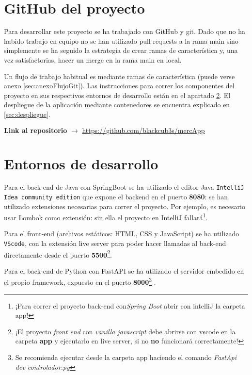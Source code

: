 \documentclass[a4paper,12pt]{report}
\begin{document}
	
	
				
			\section{GitHub del proyecto}
			
				Para desarrollar este proyecto se ha trabajado con GitHub y git. Dado que no ha habido trabajo en equipo no se han utilizado pull requests a la rama main sino simplemente se ha seguido la estrategia de crear ramas de característica y, una vez satisfactorias, hacer un merge en la rama main en local.
				
				Un flujo de trabajo habitual es mediante ramas de característica (puede verse anexo \ref{sec:anexoFlujoGit}). Las instrucciones para correr los componentes del proyecto en sus respectivos entornos de desarrollo están en el apartado \ref{sec:entornosDesarrollo}. El despliegue de la aplicación mediante contenedores se encuentra explicado en \ref{sec:despliegue}.
			

			
			
			
			
				\textbf{Link al repositorio} $\rightarrow$ \href{https://github.com/blackcub3s/mercApp}{https://github.com/blackcub3s/mercApp} 
			
	
	
		
			\section{Entornos de desarrollo}
			\label{sec:entornosDesarrollo}
			
				Para el back-end de Java con SpringBoot se ha utilizado el editor Java \texttt{IntelliJ Idea community edition} que expone el backend en el puerto\textbf{ 8080}: se han utilizado extensiones necesarias para correr el proyecto. Por ejemplo, es necesario usar Lombok como extensión: sin ella el proyecto en IntelliJ fallará\footnote{¡Para correr el proyecto back-end con\textit{Spring Boot} abrir con intelliJ la carpeta app!}.
				
				Para el front-end (archivos estáticos: HTML, CSS y JavaScript) se ha utilizado \texttt{VScode}, con la extensión live server para poder hacer llamadas al back-end directamente desde el puerto \textbf{5500}\footnote{¡El proyecto \textit{front end} con \textit{vanilla javascript} debe abrirse con vscode en la carpeta \textbf{app} y ejecutarlo en live server, si no \textbf{no} funcionará correctamente!}.
				
				Para el back-end de Python con FastAPI se ha utilizado el servidor embedido en el propio framework, expuesto en el puerto \textbf{8000}\footnote{Se recomienda ejecutar desde la carpeta app haciendo el comando \textit{FastApi dev controlador.py}} .
				
\end{document}
